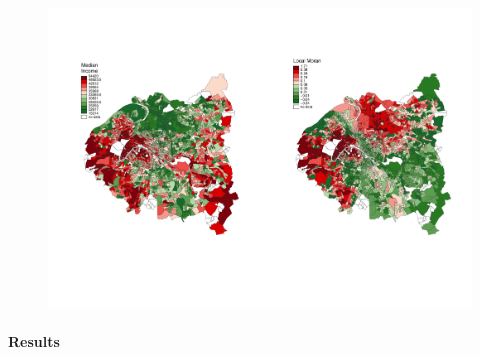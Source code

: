 \begin{figure}[h!]
\centering
\hspace{-3cm}\includegraphics[width=1.2\textwidth]{Figures/RobustnessDiscrepancy/grandParis_income_moran.pdf}\hspace{-2cm}
\vspace{-2.5cm}
\caption{}
\end{figure}

\paragraph{Results}


